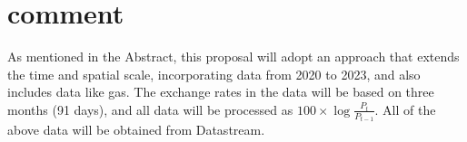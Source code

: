 \documentclass[12pt]{article}
\begin{document}
\begin{sloppypar}
\section{comment}
As mentioned in the Abstract, this proposal will adopt an approach that extends the time and spatial scale, incorporating data from 2020 to 2023, and also includes data like gas. The exchange rates in the data will be based on three months (91 days), and all data will be processed as $100 \times \log \frac{P_t}{P_{t-1}}$. All of the above data will be obtained from Datastream.

\printbibliography
\end{sloppypar}
\end{document}
